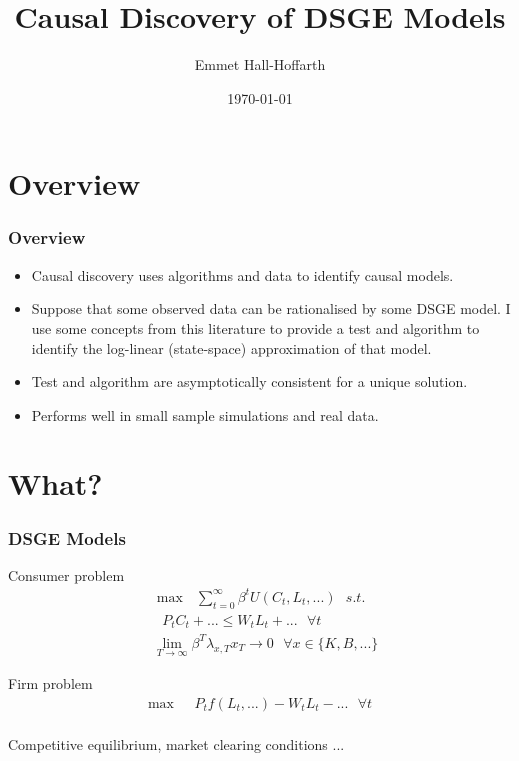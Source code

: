 \documentclass{beamer}
\title[Causal Discovery DSGE]{Causal Discovery of DSGE Models} %
\author{Emmet Hall-Hoffarth} %
\institute[Oxford] %
{
University of Oxford \\ %
\medskip
\textit{emmet.hall-hoffarth@economics.ox.ac.uk} %
}
\date{\today} %
\begin{document}
\begin{frame}
    \titlepage %
\end{frame}

\section{Overview}

\begin{frame}
    \frametitle{Overview}
    \begin{itemize}
        \item Causal discovery uses algorithms and data to identify causal models.
        \item Suppose that some observed data can be rationalised by some DSGE model. I use some concepts from this literature to provide a test and algorithm to identify the log-linear (state-space) approximation of that model.
        \item Test and algorithm are asymptotically consistent for a unique solution.
        \item Performs well in small sample simulations and real data.
    \end{itemize}
\end{frame}

\section{What?}

\begin{frame}
    \frametitle{DSGE Models}
    \begin{minipage}{0.4\textwidth}
        \centering
        Consumer problem
        \begin{align*}
            & \max \text{ } \sum_{t=0}^{\infty} \beta^t U(C_t, L_t, ...) \text{ } s.t. \\
            & \text{ } P_t C_t + ... \leq W_t L_t + ... \text{ } \forall t \\
            & \lim_{T \rightarrow \infty} \beta^T \lambda_{x,T} x_T \rightarrow 0 \text{ } \forall x \in \{K, B, ...\}
        \end{align*}
    \end{minipage}
    \begin{minipage}{0.4\textwidth}
        \centering
        Firm problem
        \begin{align*}
            \max \text{ } & P_t f(L_t, ...) - W_t L_t - ... \text{ } \forall t \\
        \end{align*}
    \end{minipage}
    \vskip 1cm
    \centering
    Competitive equilibrium, market clearing conditions ...
\end{frame}
\end{document}
